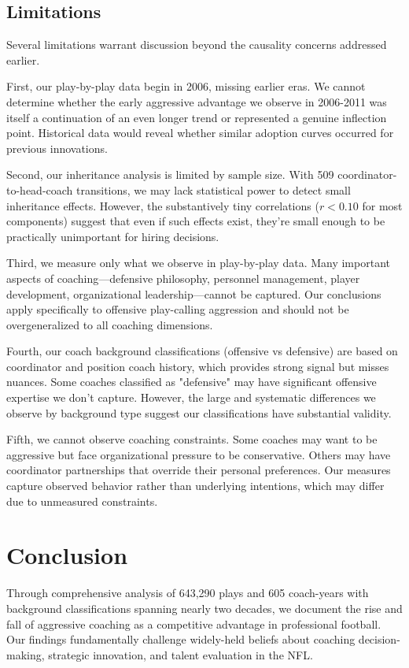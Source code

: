 \documentclass[11pt,twocolumn]{article}
\begin{document}
\subsection{Limitations}

Several limitations warrant discussion beyond the causality concerns addressed earlier.

First, our play-by-play data begin in 2006, missing earlier eras. We cannot determine whether the early aggressive advantage we observe in 2006-2011 was itself a continuation of an even longer trend or represented a genuine inflection point. Historical data would reveal whether similar adoption curves occurred for previous innovations.

Second, our inheritance analysis is limited by sample size. With 509 coordinator-to-head-coach transitions, we may lack statistical power to detect small inheritance effects. However, the substantively tiny correlations ($r<0.10$ for most components) suggest that even if such effects exist, they're small enough to be practically unimportant for hiring decisions.

Third, we measure only what we observe in play-by-play data. Many important aspects of coaching---defensive philosophy, personnel management, player development, organizational leadership---cannot be captured. Our conclusions apply specifically to offensive play-calling aggression and should not be overgeneralized to all coaching dimensions.

Fourth, our coach background classifications (offensive vs defensive) are based on coordinator and position coach history, which provides strong signal but misses nuances. Some coaches classified as "defensive" may have significant offensive expertise we don't capture. However, the large and systematic differences we observe by background type suggest our classifications have substantial validity.

Fifth, we cannot observe coaching constraints. Some coaches may want to be aggressive but face organizational pressure to be conservative. Others may have coordinator partnerships that override their personal preferences. Our measures capture observed behavior rather than underlying intentions, which may differ due to unmeasured constraints.

\section{Conclusion}

Through comprehensive analysis of 643,290 plays and 605 coach-years with background classifications spanning nearly two decades, we document the rise and fall of aggressive coaching as a competitive advantage in professional football. Our findings fundamentally challenge widely-held beliefs about coaching decision-making, strategic innovation, and talent evaluation in the NFL.
\end{document}
